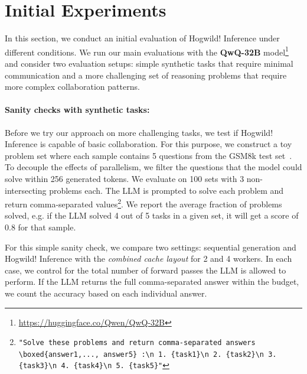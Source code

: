 \section{Initial Experiments}\label{sect:experiments}



In this section, we conduct an initial evaluation of Hogwild! Inference under different conditions. We run our main evaluations with the \textbf{QwQ-32B} model\footnote[7]{\url{https://huggingface.co/Qwen/QwQ-32B}} and consider two evaluation setups: simple synthetic tasks that require minimal communication and a more challenging set of reasoning problems that require more complex collaboration patterns.

\paragraph{Sanity checks with synthetic tasks:} 
Before we try our approach on more challenging tasks, we test if Hogwild!\! Inference is capable of basic collaboration.
For this purpose, we construct a toy problem set where each sample contains 5 questions from the GSM8k test set~\cite{cobbe2021gsm8k}. To decouple the effects of parallelism, we filter the questions that the model could solve within 256 generated tokens. We evaluate on 100 sets with 3 non-intersecting problems each. The LLM is prompted to solve each problem and return comma-separated values\footnote[8]{\texttt{"Solve these problems and return comma-separated answers \textbackslash boxed\{answer1,..., answer5\} :\textbackslash n 1. \{task1\}\textbackslash n 2. \{task2\}\textbackslash n 3. \{task3\}\textbackslash n 4. \{task4\}\textbackslash n 5. \{task5\}"}}. We report the average fraction of problems solved, e.g. if the LLM solved 4 out of 5 tasks in a given set, it will get a score of 0.8 for that sample.

For this simple sanity check, we compare two settings: sequential generation and Hogwild! Inference with the \textit{combined cache layout} for 2 and 4 workers. In each case, we control for the total number of forward passes the LLM is allowed to perform. If the LLM returns the full comma-separated answer within the budget, we count the accuracy based on each individual answer.



